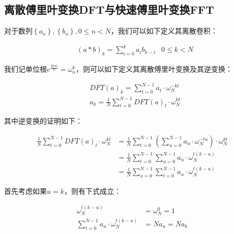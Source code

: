 \documentclass[UTF8]{book}
\begin{document}
\subsection{离散傅里叶变换DFT与快速傅里叶变换FFT}
对于数列$\left \{ a_n \right \}, \left \{ b_n \right \},0 \le n < N$，我们可以如下定义其离散卷积：
\begin{large}
    \begin{equation}
        \begin{aligned}
            &\left ( a*b \right )_k=\sum_{i=0}^{k}{a_ib_{k-i}} & 0 \le k < N
            \nonumber
        \end{aligned}
    \end{equation}
\end{large}
我们记单位根$e^{\frac{2k\pi i}{n}}=\omega_{n}^k$，则可以如下定义其离散傅里叶变换及其逆变换：
\begin{large}
    \begin{equation}
        \begin{aligned}
            &DFT(a)_k=\sum_{t=0}^{N-1}{a_t \cdot \omega_{N}^{-kt}} \\
            &a_k=\frac{1}{N}\sum_{t=0}^{N-1}{DFT(a)_t \cdot \omega_{N}^{kt}}
            \nonumber
        \end{aligned}
    \end{equation}
\end{large}
其中逆变换的证明如下：
\begin{large}
    \begin{equation}
        \begin{aligned}
            \frac{1}{N}\sum_{t=0}^{N-1}{DFT(a)_t \cdot \omega_{N}^{kt}} &= \frac{1}{N}\sum_{t=0}^{N-1}\left ( \sum_{u=0}^{N-1}a_u \cdot \omega_N^{-tu} \right ) \cdot \omega_{N}^{kt} \\
            &= \frac{1}{N}\sum_{t=0}^{N-1}\sum_{u=0}^{N-1}a_u \cdot \omega_N^{t(k-u)} \\
            &= \frac{1}{N}\sum_{u=0}^{N-1}\sum_{t=0}^{N-1}a_u \cdot \omega_N^{t(k-u)}
            \nonumber
        \end{aligned}
    \end{equation}
\end{large}
首先考虑如果$u=k$，则有下式成立：
\begin{large}
    \begin{equation}
        \begin{aligned}
            \omega_N^{t(k-u)}&=\omega_N^{0}=1 \\
            \sum_{t=0}^{N-1}a_u \cdot \omega_N^{t(k-u)}&=Na_u=Na_k
            \nonumber
        \end{aligned}
    \end{equation}
\end{large}
\end{document}
